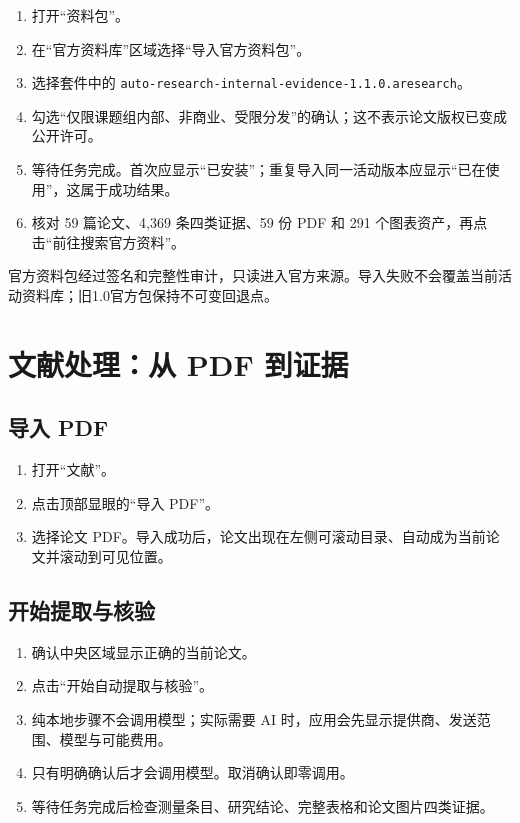 \documentclass[11pt,a4paper]{ctexart}
\begin{document}
\begin{enumerate}
  \item 打开“资料包”。
  \item 在“官方资料库”区域选择“导入官方资料包”。
  \item 选择套件中的 \texttt{auto-research-internal-evidence-1.1.0.aresearch}。
  \item 勾选“仅限课题组内部、非商业、受限分发”的确认；这不表示论文版权已变成公开许可。
  \item 等待任务完成。首次应显示“已安装”；重复导入同一活动版本应显示“已在使用”，这属于成功结果。
  \item 核对 59 篇论文、4,369 条四类证据、59 份 PDF 和 291 个图表资产，再点击“前往搜索官方资料”。
\end{enumerate}

官方资料包经过签名和完整性审计，只读进入官方来源。导入失败不会覆盖当前活动资料库；旧1.0官方包保持不可变回退点。

\section{文献处理：从 PDF 到证据}

\subsection{导入 PDF}
\begin{enumerate}
  \item 打开“文献”。
  \item 点击顶部显眼的“导入 PDF”。
  \item 选择论文 PDF。导入成功后，论文出现在左侧可滚动目录、自动成为当前论文并滚动到可见位置。
\end{enumerate}

\subsection{开始提取与核验}
\begin{enumerate}
  \item 确认中央区域显示正确的当前论文。
  \item 点击“开始自动提取与核验”。
  \item 纯本地步骤不会调用模型；实际需要 AI 时，应用会先显示提供商、发送范围、模型与可能费用。
  \item 只有明确确认后才会调用模型。取消确认即零调用。
  \item 等待任务完成后检查测量条目、研究结论、完整表格和论文图片四类证据。
\end{enumerate}
\end{document}
